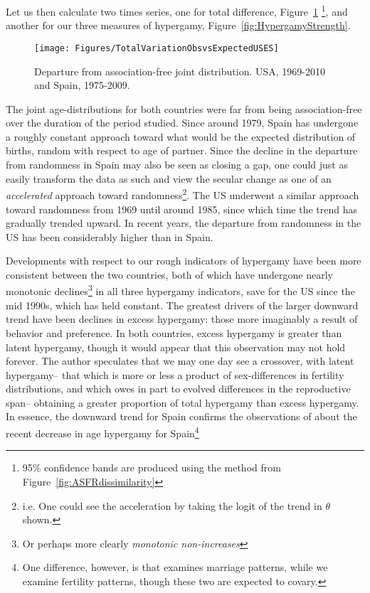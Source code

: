 Let us then calculate two times series, one for total difference,
Figure~\ref{fig:Theta} \footnote{95\% confidence bands are produced
    using the method from Figure~\ref{fig:ASFRdissimilarity}}, and another for
    our three measures of hypergamy, Figure~\ref{fig:HypergamyStrength}.
\begin{figure}[!ht]
  \centering
    \caption{Departure from association-free joint distribution. USA,
    1969-2010 and Spain, 1975-2009.}
     \texttt{[image: Figures/TotalVariationObsvsExpectedUSES]}
     \label{fig:Theta}
\end{figure}
The joint age-distributions for both countries were far from being
association-free over the duration of the period studied. Since around
1979, Spain has undergone a roughly constant approach toward what would be the
expected distribution of births, random with respect to age of
partner. Since the decline in the departure from randomness in Spain 
may also be seen as closing a gap, one could just as
easily transform the data as such and view the secular change as one of an
\textit{accelerated} approach toward randomness\footnote{i.e. One could see the
acceleration by taking the logit of the trend in $\theta$ shown.}. The US
underwent a similar approach toward randomness from 1969 until around 1985,
since which time the trend has gradually trended upward. In recent years, the
departure from randomness in the US has been considerably higher than in Spain.

Developments with respect to our rough indicators of hypergamy have been more
consistent between the two countries, both of which have undergone nearly
monotonic declines\footnote{Or perhaps more clearly \textit{monotonic
non-increases}} in all three hypergamy indicators, save for the US since the mid
1990s, which has held constant. The greatest drivers of the larger downward trend
have been declines in excess hypergamy: those more imaginably a result of
behavior and preference. In both countries, excess hypergamy is greater than
latent hypergamy, though it would appear that this observation may not hold forever. The author
 speculates that we may one day see a crossover, with latent hypergamy-- that
which is more or less a product of sex-differences in fertility distributions,
and which owes in part to evolved differences in the reproductive span-- obtaining a
greater proportion of total hypergamy than excess hypergamy. In essence, the
downward trend for Spain confirms the observations of \citet{esteve2009long}
about the recent decrease in age hypergamy for Spain\footnote{One difference,
however, is that \citet{esteve2009long} examines marriage patterns, while we
examine fertility patterns, though these two are expected to covary.}


